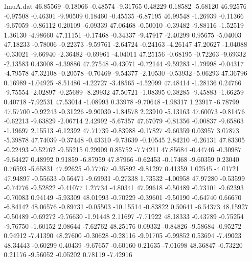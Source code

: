 \begin{filecontents}{ImuA.dat}
  46.85569   -0.18066   -0.48574   -9.31765    0.48229    0.18582   -5.68120
  46.92576   -0.97508   -0.46301   -9.90509    0.18460   -0.45535   -6.87195
  46.99548   -1.26939   -0.11366   -9.67059   -0.86112    0.20109   -6.09339
  47.06468   -0.50010   -0.39482   -9.88116   -1.52519    1.36130   -4.98660
  47.11151   -0.17468   -0.34337   -9.47917   -2.40299    0.95675   -5.04003
  47.18233   -0.78006   -0.22373   -9.59761   -2.64724   -0.24163   -4.26147
  47.20627   -1.04088   -0.33021   -9.66940   -2.36482   -0.69961   -4.04011
  47.25156   -0.68195   -0.72263   -9.69332   -2.13583    0.43008   -4.39886
  47.27548   -0.43071   -0.72144   -9.59283   -1.79998   -0.04317   -4.79578
  47.32108   -0.20578   -0.70469   -9.54377   -2.10530   -0.53932   -5.06293
  47.36796    0.16989   -1.04925   -8.51486   -4.22727   -3.48565   -4.52099
  47.48414   -1.28136    0.24766   -9.75554   -2.02897   -0.25689   -8.29932
  47.50721   -1.08395    0.38285   -9.45883   -1.66259    0.40718   -7.92531
  47.53014   -1.08993    0.33978   -9.70648   -1.98317    1.23917   -6.78799
  47.57700   -0.92243   -0.31226   -9.90030   -1.84578    2.23910   -5.13163
  47.60073   -0.81476   -0.62213   -9.63829   -2.06714    2.42992   -5.67357
  47.67079   -0.81356   -0.00837   -9.65863   -1.19697    2.15513   -6.12392
  47.71739   -0.83988   -0.17827   -9.60359    0.03957    3.07873   -5.39878
  47.74039   -0.37448   -0.43310   -9.73639   -0.10545    2.84210   -6.26131
  47.83305   -0.22493   -0.52762   -9.55215    0.29909    0.85752   -7.74211
  47.85684   -0.44746   -0.30987   -9.64427    0.48992    0.91859   -6.87959
  47.87966   -0.62453   -0.17468   -9.60359    0.23040    0.76593   -5.65831
  47.92625   -0.77767   -0.35892   -9.81297    0.41359    1.02545   -4.01721
  47.94897   -0.55633   -0.56471   -9.69931   -0.27338    1.73532   -4.00958
  47.97280   -0.53599   -0.74776   -9.52822   -0.41077    1.27734   -4.80341
  47.99618   -0.50489   -0.73101   -9.62393   -0.70083    0.94149   -5.93309
  48.01993   -0.70229   -0.39601   -9.50190   -0.64740    0.66670   -6.84142
  48.06576   -0.89731   -0.05503  -10.15514   -0.83822    0.50641   -6.54373
  48.15927   -0.50489   -0.69272   -9.76630   -1.91448    2.11697   -7.71922
  48.18333   -0.43789   -0.75254   -9.76750   -1.60152    2.08644   -7.62762
  48.25176    0.09332   -0.84826   -9.58684   -0.95272    0.94912   -7.41390
  48.27600   -0.30628   -0.28116   -9.91705   -0.99852    0.53694   -7.49023
  48.34443   -0.60299    0.40439   -9.67657   -0.60160    0.21635   -7.01698
  48.36847   -0.73220    0.21176   -9.56052   -0.05202    0.78119   -7.42916

\end{filecontents}
